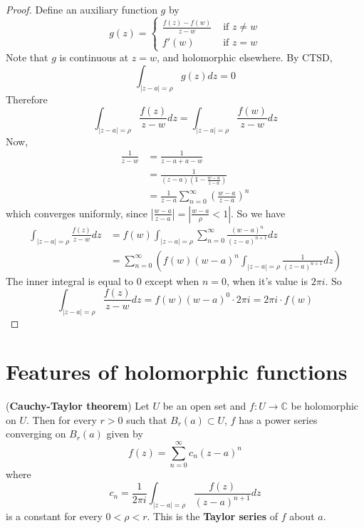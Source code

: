 \begin{proof}
	Define an auxiliary function $g$ by
	\[
		g(z) = \begin{cases}
			\frac{f(z) - f(w)}{z - w} & \text{ if } z \ne w \\
			f'(w) & \text{ if } z = w
		\end{cases}
	\]
	Note that $g$ is continuous at $z = w$, and holomorphic elsewhere. By CTSD,
	\[
		\int_{|z - a| = \rho} g(z) dz = 0
	\]
	Therefore
	\[
		\int_{|z - a| = \rho} \frac{f(z)}{z - w} dz = \int_{|z - a| = \rho} \frac{f(w)}{z - w} dz
	\]
	Now,
	\[
		\begin{aligned}
			\frac{1}{z - w}
				& = \frac{1}{z - a + a - w} \\
				& = \frac{1}{(z - a)(1 - \frac{w - a}{z - a})} \\
				& = \frac{1}{z - a} \sum_{n = 0}^{\infty} {\left( \frac{w - a}{z - a} \right)}^n
		\end{aligned}
	\]
	which converges uniformly, since $|\frac{w - a}{z - a}| = |\frac{w - a}{\rho} < 1|$.
	So we have
	\[
		\begin{aligned}
			\int_{|z - a| = \rho} \frac{f(z)}{z - w} dz
				& = f(w) \int_{|z - a| = \rho} \sum_{n = 0}^{\infty} \frac{{(w - a)}^n}{{(z - a)}^{n + 1}} dz \\
				& = \sum_{n = 0}^{\infty} \left( f(w) {(w - a)}^n \int_{|z - a| = \rho} \frac{1}{{(z - a)}^{n + 1}} dz \right)
		\end{aligned}
	\]
	The inner integral is equal to $0$ except when $n = 0$, when it's value is $2 \pi i$. So
	\[
		\int_{|z - a| = \rho} \frac{f(z)}{z - w} dz = f(w) {(w - a)}^0 \cdot 2 \pi i = 2 \pi i \cdot f(w)
	\]
\end{proof}

\section{Features of holomorphic functions}

\begin{theorem}
	(\textbf{Cauchy-Taylor theorem}) Let $U$ be an open set and $f: U \rightarrow \mathbb{C}$ be holomorphic on $U$. Then for every $r > 0$ such that $B_r(a) \subset U$, $f$ has a power series converging on $B_r(a)$ given by
	\[
		f(z) = \sum_{n = 0}^{\infty} c_n {(z - a)}^n
	\]
	where
	\[
		c_n = \frac{1}{2 \pi i} \int_{|z - a| = \rho} \frac{f(z)}{{(z - a)}^{n + 1}} dz
	\]
	is a constant for every $0 < \rho < r$. This is the \textbf{Taylor series} of $f$ about $a$.
\end{theorem}

